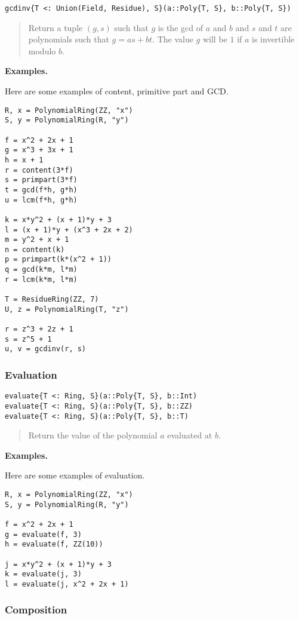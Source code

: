 \documentclass[a4paper,10pt]{article}
\newcommand{\desc}[1]{\vspace{-3mm}\begin{quote}#1\end{quote}}
\begin{document}
{{\begin{lstlisting}
gcdinv{T <: Union(Field, Residue), S}(a::Poly{T, S}, b::Poly{T, S})
\end{lstlisting}

\desc{Return a tuple $(g, s)$ such that $g$ is the gcd of $a$ and $b$ and $s$
and $t$ are polynomials such that $g = as + bt$. The value $g$ will be $1$ if
$a$ is invertible modulo $b$.}

\textbf{Examples.}

Here are some examples of content, primitive part and GCD.

\begin{lstlisting}
R, x = PolynomialRing(ZZ, "x")
S, y = PolynomialRing(R, "y")

f = x^2 + 2x + 1
g = x^3 + 3x + 1
h = x + 1
r = content(3*f)
s = primpart(3*f)
t = gcd(f*h, g*h)
u = lcm(f*h, g*h)

k = x*y^2 + (x + 1)*y + 3
l = (x + 1)*y + (x^3 + 2x + 2)
m = y^2 + x + 1
n = content(k)
p = primpart(k*(x^2 + 1))
q = gcd(k*m, l*m)
r = lcm(k*m, l*m)

T = ResidueRing(ZZ, 7)
U, z = PolynomialRing(T, "z")

r = z^3 + 2z + 1
s = z^5 + 1
u, v = gcdinv(r, s)
\end{lstlisting}

\subsubsection{Evaluation}

\begin{lstlisting}
evaluate{T <: Ring, S}(a::Poly{T, S}, b::Int)
evaluate{T <: Ring, S}(a::Poly{T, S}, b::ZZ)
evaluate{T <: Ring, S}(a::Poly{T, S}, b::T)
\end{lstlisting}

\desc{Return the value of the polynomial $a$ evaluated at $b$.}

\textbf{Examples.}

Here are some examples of evaluation.

\begin{lstlisting}
R, x = PolynomialRing(ZZ, "x")
S, y = PolynomialRing(R, "y")

f = x^2 + 2x + 1
g = evaluate(f, 3)
h = evaluate(f, ZZ(10))

j = x*y^2 + (x + 1)*y + 3
k = evaluate(j, 3)
l = evaluate(j, x^2 + 2x + 1)
\end{lstlisting}

\subsubsection{Composition}

}}
\end{document}
